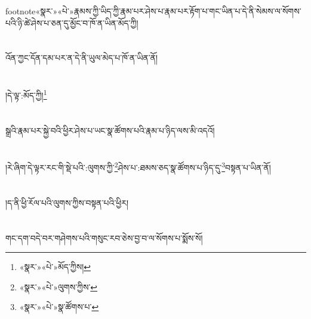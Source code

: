 footnote{«སྣར་»«པེ་»རྣམས་ཀྱི་}ཡིད་ཀྱི་རྣམ་པར་ཤེས་པ་རྣམ་པར་རྟོག་པ་གང་ཡིན་པ་དེ་ནི་སེམས་ལ་སོགས་པའི་ཉི་ཚེ་ཤེས་པ་ཅན་དུ་མྱོང་བ་ཁོ་ན་ཡིན་མོད་ཀྱི།\chapter{ }འོན་ཀྱང་དོན་དམ་པར་ན་དེ་ནི་ཡུལ་མེད་པ་ཁོ་ན་ཡིན་ནོ།\chapter{ }།དེ་ལྟ་:མོད་ཀྱི།\footnote{«སྣར་»«པེ་»མོད་ཀྱིས།}\chapter{ }སྒྲའི་རྣམ་པར་སྐྱེ་བའི་ཕྱིར་ཤེས་པ་ཡང་སྣ་ཚོགས་པའི་རྣམ་པ་ཉིད་ལས་མི་འདའོ།\chapter{ }།རེ་ཞིག་དེ་ལྟར་རང་གི་སྡེ་པའི་:ལུགས་ཀྱི་\footnote{«སྣར་»«པེ་»ལུགས་ཀྱིས་}ཤེས་པ་:ཐམས་ཅད་སྣ་ཚོགས་པ་ཉིད་དུ་\footnote{«སྣར་»«པེ་»སྣ་ཚོགས་པ་}བསྟན་པ་ཡིན་ནོ།\chapter{ }།ད་ནི་ཕྱི་རོལ་པའི་ལུགས་ཀྱིས་བསྟན་པའི་ཕྱིར།\chapter{ }གང་དག་བདེ་བར་གཤེགས་པའི་གསུང་རབ་ཅེས་བྱ་བ་ལ་སོགས་པ་སྨོས་སོ།\